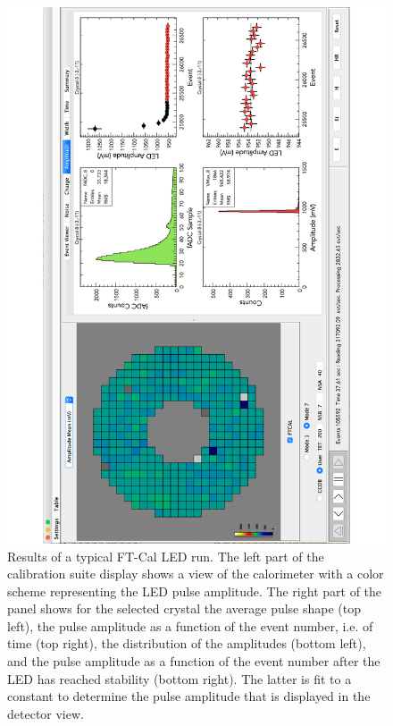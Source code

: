 \begin{figure}
\includegraphics[height=1.0\columnwidth,angle=270]{fig/ftcal_ledrun.pdf}
\caption{Results of a typical FT-Cal LED run. The left part of the calibration suite display shows a view of the
  calorimeter with a color scheme representing the LED pulse amplitude. The right part of the panel shows for the
  selected crystal the average pulse shape (top left), the pulse amplitude as a function of the event number, i.e. of
  time (top right), the distribution of the amplitudes (bottom left), and the pulse amplitude as a function of the
  event number after the LED has reached stability (bottom right). The latter is fit to a constant to determine the
  pulse amplitude that is displayed in the detector view.}
\label{fig:ftcal_ledrun}
\end{figure}

